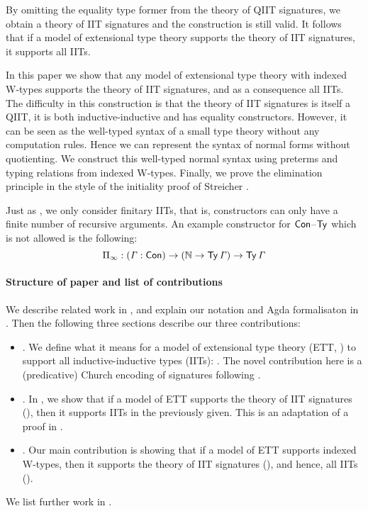 \documentclass[a4paper,UKenglish,cleveref, autoref]{lipics-v2019}
\begin{document}
By omitting the equality type former from the theory of QIIT
signatures, we obtain a theory of IIT signatures and the construction
is still valid. It follows that if a model of extensional type theory
supports the theory of IIT signatures, it supports all IITs.

In this paper we show that any model of extensional type theory with
indexed W-types supports the theory of IIT signatures, and as a
consequence all IITs. The difficulty in this construction is that the
theory of IIT signatures is itself a QIIT, it is both
inductive-inductive and has equality constructors. However, it can be
seen as the well-typed syntax of a small type theory without any
computation rules. Hence we can represent the syntax of normal forms
without quotienting. We construct this well-typed normal syntax using
preterms and typing relations from indexed W-types. Finally, we prove
the elimination principle in the style of the initiality proof of
Streicher \cite{streichersemantics}.

Just as \cite{Kaposi:2019:CQI:3302515.3290315}, we only consider
finitary IITs, that is, constructors can only have a finite number of
recursive arguments. An example constructor for $\mathsf{Con}$--$\mathsf{Ty}$ which is
not allowed is the following:
\[
  \Pi_\infty : (\mathit{\Gamma} : \mathsf{Con}) \rightarrow (\mathbb{N} \rightarrow \mathsf{Ty}\,\mathit{\Gamma}) \rightarrow \mathsf{Ty}\,\mathit{\Gamma}
\]

\paragraph*{Structure of paper and list of contributions}

We describe related work in , and explain our
notation and Agda formalisaton in . Then the
following three sections describe our three contributions:
\begin{itemize}
\item {}. We define what it means for a
  model of extensional type theory (ETT, ) to support
  all inductive-inductive types (IITs): . The novel
  contribution here is a (predicative) Church encoding of signatures
  following \cite{DBLP:conf/lics/AwodeyFS18}.
\item {}. In , we show that if a
  model of ETT supports the theory of IIT signatures
  (), then it supports IITs in the previously
  given. This is an adaptation of a proof in
  \cite{Kaposi:2019:CQI:3302515.3290315}.
\item {}. Our main contribution is showing that if a
  model of ETT supports indexed W-types, then it supports the theory
  of IIT signatures (), and hence, all IITs ().
\end{itemize}
We list further work in .
\end{document}
